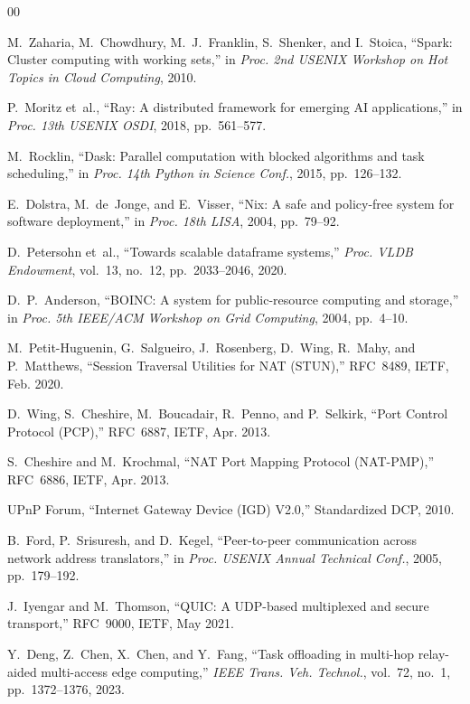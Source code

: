 \documentclass[conference]{IEEEtran}
\begin{document}
\begin{thebibliography}{00}

 M.~Zaharia, M.~Chowdhury, M.~J.~Franklin, S.~Shenker, and I.~Stoica, ``Spark: Cluster computing with working sets,'' in \textit{Proc. 2nd USENIX Workshop on Hot Topics in Cloud Computing}, 2010.

 P.~Moritz et~al., ``Ray: A distributed framework for emerging AI applications,'' in \textit{Proc. 13th USENIX OSDI}, 2018, pp.~561--577.

 M.~Rocklin, ``Dask: Parallel computation with blocked algorithms and task scheduling,'' in \textit{Proc. 14th Python in Science Conf.}, 2015, pp.~126--132.

 E.~Dolstra, M.~de~Jonge, and E.~Visser, ``Nix: A safe and policy-free system for software deployment,'' in \textit{Proc. 18th LISA}, 2004, pp.~79--92.

 D.~Petersohn et~al., ``Towards scalable dataframe systems,'' \textit{Proc. VLDB Endowment}, vol.~13, no.~12, pp.~2033--2046, 2020.

 D.~P.~Anderson, ``BOINC: A system for public-resource computing and storage,'' in \textit{Proc. 5th IEEE/ACM Workshop on Grid Computing}, 2004, pp.~4--10.

 M.~Petit-Huguenin, G.~Salgueiro, J.~Rosenberg, D.~Wing, R.~Mahy, and P.~Matthews, ``Session Traversal Utilities for NAT (STUN),'' RFC~8489, IETF, Feb. 2020.

 D.~Wing, S.~Cheshire, M.~Boucadair, R.~Penno, and P.~Selkirk, ``Port Control Protocol (PCP),'' RFC~6887, IETF, Apr. 2013.

 S.~Cheshire and M.~Krochmal, ``NAT Port Mapping Protocol (NAT-PMP),'' RFC~6886, IETF, Apr. 2013.

 UPnP Forum, ``Internet Gateway Device (IGD) V2.0,'' Standardized DCP, 2010.

 B.~Ford, P.~Srisuresh, and D.~Kegel, ``Peer-to-peer communication across network address translators,'' in \textit{Proc. USENIX Annual Technical Conf.}, 2005, pp.~179--192.

 J.~Iyengar and M.~Thomson, ``QUIC: A UDP-based multiplexed and secure transport,'' RFC~9000, IETF, May 2021.

 Y.~Deng, Z.~Chen, X.~Chen, and Y.~Fang, ``Task offloading in multi-hop relay-aided multi-access edge computing,'' \textit{IEEE Trans. Veh. Technol.}, vol.~72, no.~1, pp.~1372--1376, 2023.


\end{thebibliography}
\end{document}

